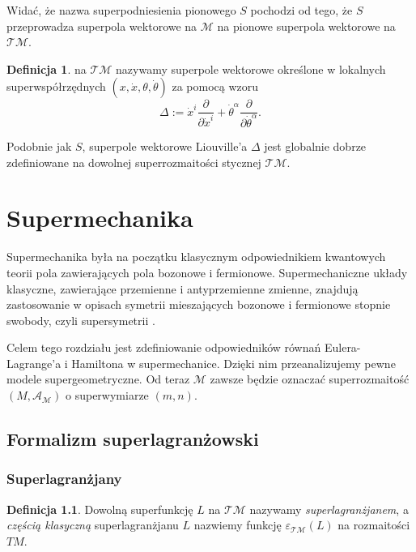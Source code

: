 \documentclass[11pt,a4paper]{report}
\theoremstyle{definition}
\newtheorem{definition}[theorem]{Definicja}
\begin{document}
Widać, że nazwa superpodniesienia pionowego $S$ pochodzi od tego, że $S$ przeprowadza superpola wektorowe na $\mathcal M$ na pionowe superpola wektorowe na $\mathcal{TM}.$
 
\begin{definition}  na $\mathcal{TM}$ nazywamy  superpole wektorowe określone w lokalnych superwspółrzędnych $(x, \dot x, \theta, \dot \theta)$ za pomocą wzoru
\begin{equation*}
  	\Delta:=\dot x^i\frac{\partial}{\partial \dot x^i}+\dot\theta^\alpha \frac{\partial}{\partial \dot\theta^\alpha}.
\end{equation*}
\end{definition}

Podobnie jak $S$, superpole wektorowe Liouville'a $\Delta$ jest globalnie dobrze zdefiniowane na dowolnej superrozmaitości stycznej $\mathcal {TM}$.

\chapter{Supermechanika}

Supermechanika była na początku klasycznym odpowiednikiem kwantowych teorii pola zawierających pola bozonowe i fermionowe. Supermechaniczne układy klasyczne, zawierające przemienne i antyprzemienne zmienne, znajdują zastosowanie w opisach symetrii mieszających bozonowe i fermionowe stopnie swobody, czyli supersymetrii \cite{ibort}.

Celem tego rozdziału jest zdefiniowanie odpowiedników równań Eulera-Lagrange'a i Hamiltona w supermechanice. Dzięki nim przeanalizujemy pewne modele supergeometryczne. Od teraz $\mathcal{M}$ zawsze będzie oznaczać superrozmaitość $(M, \mathcal{A}_\mathcal{M})$ o superwymiarze $(m,n)$.

\section{Formalizm superlagranżowski}

\subsection{Superlagranżjany}

\begin{definition}
Dowolną superfunkcję $L$ na $\mathcal{TM}$ nazywamy \textit{superlagranżjanem}, a
\textit{częścią klasyczną} superlagranżjanu $L$ nazwiemy funkcję $\varepsilon_{\mathcal{T} \mathcal{M}} (L)$ na rozmaitości $TM$.
\end{definition}
\end{document}
